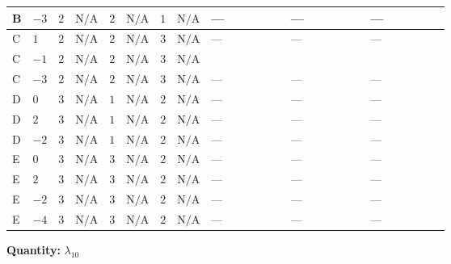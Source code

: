 \documentclass[8pt]{article}
\begin{document}
\begin{landscape}
\begin{longtable}{@{}llcccccc >{\raggedright\arraybackslash}p{0.21\linewidth} >{\raggedright\arraybackslash}p{0.21\linewidth} >{\raggedright\arraybackslash}p{0.21\linewidth}@{}}
\midrule
B & $-3$ & $2$ & $\text{N/A}$ & $2$ & $\text{N/A}$ & $1$ & $\text{N/A}$ & --- & --- & --- \\
\midrule
C & $1$ & $2$ & $\text{N/A}$ & $2$ & $\text{N/A}$ & $3$ & $\text{N/A}$ & --- & --- & --- \\
\midrule
C & $-1$ & $2$ & $\text{N/A}$ & $2$ & $\text{N/A}$ & $3$ & $\text{N/A}$ & \scriptsize\adjustbox{max width=\linewidth}{$\begin{gathered} +{\lambda_{12}^{(1)}} (6 {\lambda_{10}}+6 {\lambda_{11}})\end{gathered}$} & \scriptsize\adjustbox{max width=\linewidth}{$\begin{gathered} +{\lambda_{12}^{(A)}} \left(-\frac{5 {\lambda_{10}}}{2}-\frac{{\lambda_{11}}}{2}\right)\end{gathered}$} & \scriptsize\adjustbox{max width=\linewidth}{$\begin{gathered} +{\lambda_{HS_2}^{(1)}} (2 {\lambda_{H H^\dagger S_1^\dagger S_2^\dagger}^{\rm Cross}}-2 {\lambda_{X_{17}}^{(1)}})\end{gathered}$} \\
\midrule
C & $-3$ & $2$ & $\text{N/A}$ & $2$ & $\text{N/A}$ & $3$ & $\text{N/A}$ & --- & --- & --- \\
\midrule
D & $0$ & $3$ & $\text{N/A}$ & $1$ & $\text{N/A}$ & $2$ & $\text{N/A}$ & --- & --- & --- \\
\midrule
D & $2$ & $3$ & $\text{N/A}$ & $1$ & $\text{N/A}$ & $2$ & $\text{N/A}$ & --- & --- & --- \\
\midrule
D & $-2$ & $3$ & $\text{N/A}$ & $1$ & $\text{N/A}$ & $2$ & $\text{N/A}$ & --- & --- & --- \\
\midrule
E & $0$ & $3$ & $\text{N/A}$ & $3$ & $\text{N/A}$ & $2$ & $\text{N/A}$ & --- & --- & --- \\
\midrule
E & $2$ & $3$ & $\text{N/A}$ & $3$ & $\text{N/A}$ & $2$ & $\text{N/A}$ & --- & --- & --- \\
\midrule
E & $-2$ & $3$ & $\text{N/A}$ & $3$ & $\text{N/A}$ & $2$ & $\text{N/A}$ & --- & --- & --- \\
\midrule
E & $-4$ & $3$ & $\text{N/A}$ & $3$ & $\text{N/A}$ & $2$ & $\text{N/A}$ & --- & --- & --- \\
\midrule
\bottomrule
\end{longtable}
\clearpage
\noindent\textbf{Quantity: }$\lambda_{10}$\par\smallskip

\end{landscape}
\end{document}
